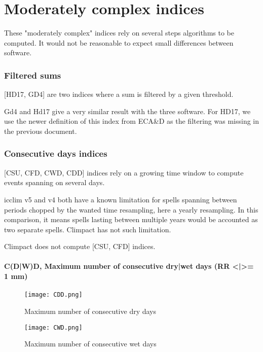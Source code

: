 \documentclass[a4paper,11pt]{article}
\begin{document}
\part{Moderately complex indices}
    These "moderately complex" indices rely on several steps algorithms to be computed.
    It would not be reasonable to expect small differences between software.

    \section{Filtered sums}
        [HD17, GD4] are two indices where a sum is filtered by a given threshold.

        Gd4 and Hd17 give a very similar result with the three software.
        For HD17, we use the newer definition of this index from ECA\&D \cite{doc/ecad_new} as the filtering was missing in the previous document.

    \section{Consecutive days indices} \label{section/consecutive_days}
        [CSU, CFD, CWD, CDD] indices rely on a growing time window to compute events spanning on several days.

        icclim v5 and v4 both have a known limitation for spells spanning between periods chopped by the wanted time resampling, here a yearly resampling.
        In this comparison, it means spells lasting between multiple years would be accounted as two separate spells.
        Climpact has not such limitation.

        Climpact does not compute [CSU, CFD] indices.

        \subsection{C(D|W)D, Maximum number of consecutive dry|wet days (RR <|>= 1 mm)}
            \begin{figure}[h]
                \centering
                \texttt{[image: CDD.png]}
                \caption{Maximum number of consecutive dry days}
                \label{figure/cdd}
            \end{figure}
            \begin{figure}[h]
                \centering
                \texttt{[image: CWD.png]}
                \caption{Maximum number of consecutive wet days}
                \label{figure/cwd}
            \end{figure}
\end{document}
